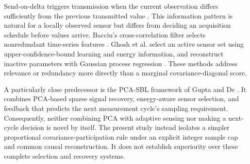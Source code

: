\documentclass[12pt]{article}
\begin{document}
\begin{table}[t]
\centering
\small
\caption{Relationship to the closest methodological families. ``Rate'' means
proportional per-channel rates rather than binary inclusion.}
\label{tab:positioning}
\end{table}

Send-on-delta triggers transmission when the current observation differs
sufficiently from the previous transmitted value \cite{miskowicz2006send}.
This information pattern is natural for a locally observed sensor but differs
from deciding an acquisition schedule before values arrive. Bacciu's
cross-correlation filter selects nonredundant time-series features
\cite{bacciu2016unsupervised}. Ghosh et al. select an active sensor set using
upper-confidence-bound learning and energy information, and reconstruct
inactive parameters with Gaussian process regression \cite{ghosh2021adaptive}.
These methods address relevance or redundancy more directly than a marginal
covariance-diagonal score.

A particularly close predecessor is the PCA-SBL framework of Gupta and De
\cite{gupta2018sbl}. It combines PCA-based sparse signal recovery, energy-aware
sensor selection, and feedback that predicts the next measurement cycle's
sampling requirement. Consequently, neither combining PCA with adaptive sensing
nor making a next-cycle decision is novel by itself. The present study instead
isolates a simpler proportional covariance-participation rule under an explicit
integer sample cap and common causal reconstruction. It does not establish
superiority over these complete selection and recovery systems.
\end{document}
